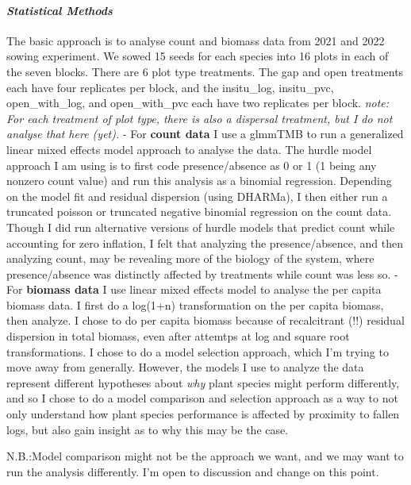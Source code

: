 \documentclass[
]{article}
\begin{document}
\hypertarget{statistical-methods-2}{%
\paragraph{\texorpdfstring{\emph{Statistical Methods}
}{Statistical Methods  }}\label{statistical-methods-2}}

The basic approach is to analyse count and biomass data from 2021 and
2022 sowing experiment. We sowed 15 seeds for each species into 16 plots
in each of the seven blocks. There are 6 plot type treatments. The gap
and open treatments each have four replicates per block, and the
insitu\_log, insitu\_pvc, open\_with\_log, and open\_with\_pvc each have
two replicates per block. \emph{note: For each treatment of plot type,
there is also a dispersal treatment, but I do not analyse that here
(yet).} - For \textbf{count data} I use a glmmTMB to run a generalized
linear mixed effects model approach to analyse the data. The hurdle
model approach I am using is to first code presence/absence as 0 or 1 (1
being any nonzero count value) and run this analysis as a binomial
regression. Depending on the model fit and residual dispersion (using
DHARMa), I then either run a truncated poisson or truncated negative
binomial regression on the count data. Though I did run alternative
versions of hurdle models that predict count while accounting for zero
inflation, I felt that analyzing the presence/absence, and then
analyzing count, may be revealing more of the biology of the system,
where presence/absence was distinctly affected by treatments while count
was less so. - For \textbf{biomass data} I use linear mixed effects
model to analyse the per capita biomass data. I first do a log(1+n)
transformation on the per capita biomass, then analyze. I chose to do
per capita biomass because of recalcitrant (!!) residual dispersion in
total biomass, even after attemtps at log and square root
transformations. I chose to do a model selection approach, which I'm
trying to move away from generally. However, the models I use to analyze
the data represent different hypotheses about \emph{why} plant species
might perform differently, and so I chose to do a model comparison and
selection approach as a way to not only understand how plant species
performance is affected by proximity to fallen logs, but also gain
insight as to why this may be the case.

N.B.:Model comparison might not be the approach we want, and we may want
to run the analysis differently. I'm open to discussion and change on
this point.
\end{document}
